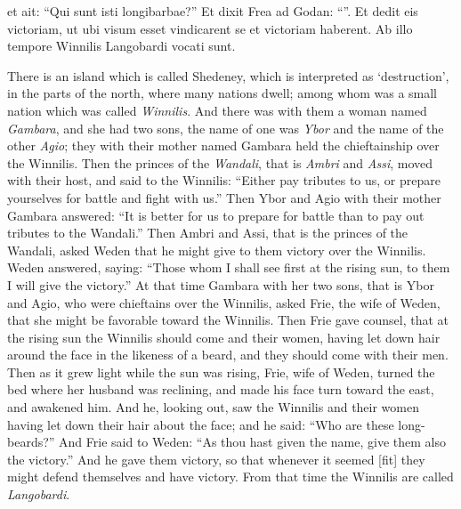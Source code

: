 et ait: “Qui sunt isti longibarbae?”
\pva Et dixit Frea ad Godan: “”.
\pva Et dedit eis victoriam, ut ubi visum esset vindicarent se et victoriam haberent.
\pva Ab illo tempore Winnilis Langobardi vocati sunt.\epa

\bpb\pvb There is an island which is called Shedeney, which is interpreted as ‘destruction’, in the parts of the north, where many nations dwell; among whom was a small nation which was called \emph{Winnilis}.
\pvb And there was with them a woman named \emph{Gambara}, and she had two sons, the name of one was \emph{Ybor} and the name of the other \emph{Agio}; they with their mother named Gambara held the chieftainship over the Winnilis.
\pvb Then the princes of the \emph{Wandali}, that is \emph{Ambri} and \emph{Assi}, moved with their host,
\pvb and said to the Winnilis: “Either pay tributes to us, or prepare yourselves for battle and fight with us.”
\pvb Then Ybor and Agio with their mother Gambara answered: “It is better for us to prepare for battle than to pay out tributes to the Wandali.”
\pvb Then Ambri and Assi, that is the princes of the Wandali, asked Weden that he might give to them victory over the Winnilis.
\pvb Weden answered, saying: “Those whom I shall see first at the rising sun, to them I will give the victory.”
\pvb At that time Gambara with her two sons, that is Ybor and Agio, who were chieftains over the Winnilis, asked Frie, the wife of Weden, that she might be favorable toward the Winnilis.
\pvb Then Frie gave counsel, that at the rising sun the Winnilis should come and their women, having let down hair around the face in the likeness of a beard, and they should come with their men.
\pvb Then as it grew light while the sun was rising, Frie, wife of Weden, turned the bed where her husband was reclining, and made his face turn toward the east, and awakened him.
\pvb And he, looking out, saw the Winnilis and their women having let down their hair about the face;
and he said: “Who are these long-beards?”
\pvb And Frie said to Weden: “As thou hast given the name, give them also the victory.”
\pvb And he gave them victory, so that whenever it seemed [fit] they might defend themselves and have victory.
\pvb From that time the Winnilis are called \emph{Langobardi}.\epb\epg
